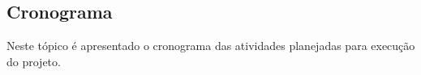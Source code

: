 \begin{landscape}
\chapter[Cronograma]{Cronograma}
\label{chap:cronograma}
	
	Neste tópico é apresentado o cronograma das atividades planejadas para execução do projeto.


\end{landscape}
